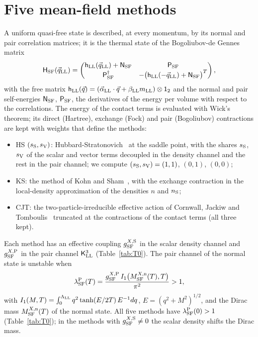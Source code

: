 \documentclass[aps,prd,twocolumn,superscriptaddress,nofootinbib,floatfix,longbibliography]{revtex4-2}
\newcommand{\LL}{{\rm LL}}
\newcommand{\SF}{{\rm SF}}
\begin{document}
\section{Five mean-field methods}
\label{sec:methods}

A uniform quasi-free state is described, at every momentum, by its normal and pair correlation matrices; it is the
thermal state of the Bogoliubov-de Gennes matrix
\begin{equation}
\mathsf H_\SF(\vec q_\LL)=\begin{pmatrix}\mathsf h_\LL(\vec q_\LL)+\mathsf N_\SF&\mathsf P_\SF\\\mathsf P_\SF^\dagger&-\big(\mathsf h_\LL(-\vec q_\LL)+\mathsf N_\SF\big)^T\end{pmatrix},
\label{eq:BdG}
\end{equation}
with the free matrix $\mathsf h_\LL(\vec q)=(\vec\alpha_\LL\cdot\vec q+\beta_\LL m_\LL)\otimes\mathsf 1_2$ and the normal and
pair self-energies $\mathsf N_\SF$, $\mathsf P_\SF$, the derivatives of the energy per volume with respect to the
correlations. The energy of the contact terms is evaluated with Wick's theorem; its direct (Hartree), exchange (Fock) and
pair (Bogoliubov) contractions are kept with weights that define the methods:
\begin{itemize}
\item HS $(s_{\rm S},s_{\rm V})$: Hubbard-Stratonovich~\cite{Hubbard1959,Stratonovich1957} at the saddle point, with the
shares $s_{\rm S}$, $s_{\rm V}$ of the scalar and vector terms decoupled in the density channel and the rest in the pair
channel; we compute $(s_{\rm S},s_{\rm V})=(1,1)$, $(0,1)$, $(0,0)$;
\item KS: the method of Kohn and Sham~\cite{HohenbergKohn1964,KohnSham1965,Mermin1965}, with the exchange contraction in
the local-density approximation of the densities $n$ and $n_{\rm S}$;
\item CJT: the two-particle-irreducible effective action of Cornwall, Jackiw and Tomboulis~\cite{CJT1974} truncated at the
contractions of the contact terms (all three kept).
\end{itemize}
Each method has an effective coupling $g^{X,{\rm S}}_\SF$ in the scalar density channel and $g^{X,{\rm P}}_\SF$ in the pair
channel $\mathsf K^3_\LL$ (Table~\ref{tab:T0}). The pair channel of the normal state is unstable when
\begin{equation}
\lambda^{\rm P}_\SF(T)=\frac{g^{X,{\rm P}}_\SF\,I_1\big(M^{X,{\rm n}}_\SF(T),T\big)}{\pi^2}>1,
\label{eq:lambda}
\end{equation}
with $I_1(M,T)=\int_0^{\Lambda_\LL}q^2\tanh(E/2T)\,E^{-1}dq$, $E=(q^2+M^2)^{1/2}$, and the Dirac mass $M^{X,{\rm n}}_\SF(T)$ of
the normal state. All five methods have
$\lambda^{\rm P}_\SF(0)>1$ (Table~\ref{tab:T0}); in the methods with $g^{X,{\rm S}}_\SF\neq0$ the scalar density shifts the
Dirac mass.
\end{document}

